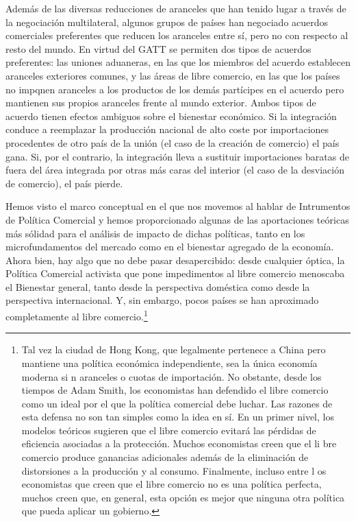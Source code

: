 \documentclass[10pt,a4paper]{article}
\begin{document}
{    Además de las diversas reducciones de aranceles que han tenido lugar a través de la negociación multilateral, algunos grupos de países han negociado acuerdos comerciales preferentes que reducen los aranceles entre sí, pero no con respecto al resto del mundo. En virtud del GATT se permiten dos tipos de acuerdos preferentes: las uniones aduaneras, en las que los miembros del acuerdo establecen aranceles exteriores comunes, y las áreas de libre comercio, en las que los países no impqnen aranceles a los productos de los demás partícipes en el acuerdo pero mantienen sus propios aranceles frente al mundo exterior. Ambos tipos de acuerdo tienen efectos ambiguos sobre el bienestar económico. Si la integración conduce a reemplazar la producción nacional de alto coste por importaciones procedentes de otro país de la unión (el caso de la creación de comercio) el país gana. Si, por el contrario, la integración lleva a sustituir importaciones baratas de fuera del área integrada por otras más caras del interior (el caso de la desviación de comercio), el país pierde.
}

Hemos visto el marco conceptual en el que nos movemos al hablar de Intrumentos de Política Comercial y hemos proporcionado algunas de las aportaciones teóricas más sólidad para el análisis de impacto de dichas políticas, tanto en los microfundamentos del mercado como en el bienestar agregado de la economía. Ahora bien, hay algo que no debe pasar desapercibido: desde cualquier óptica, la Política Comercial activista que pone impedimentos al libre comercio menoscaba el Bienestar general, tanto desde la perspectiva doméstica como desde la perspectiva internacional. Y, sin embargo, pocos países se han aproximado completamente al libre comercio.\footnote{%
    Tal vez la ciudad de Hong Kong, que legalmente pertenece a China pero mantiene una política económica independiente, sea la única economía moderna si n aranceles o cuotas de importación. No obstante, desde los tiempos de Adam Smith, los economistas han defendido el libre comercio como un ideal por el que la política comercial debe luchar. Las razones de esta defensa no son tan simples como la idea en sí. En un primer nivel, los modelos teóricos sugieren que el libre comercio evitará las pérdidas de eficiencia asociadas a la protección. Muchos economistas creen que el li bre comercio produce ganancias adicionales además de la eliminación de distorsiones a la producción y al consumo. Finalmente, incluso entre l os economistas que creen que el libre comercio no es una política perfecta, muchos creen que, en general, esta opción es mejor que ninguna otra política que pueda aplicar un gobierno.
}
\end{document}
